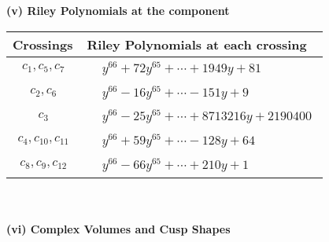 \documentclass[1p]{elsarticle_modified}
\theoremstyle{definition}
\begin{document}
\newpage\renewcommand{\arraystretch}{1}
\flushleft \textbf{(v) Riley Polynomials at the component}\newline \\
\begin{tabular}{m{50pt}|m{274pt}}
Crossings & \hspace{64pt}Riley Polynomials at each crossing \\
\hline $$\begin{aligned}c_{1},c_{5},c_{7}\end{aligned}$$&$\begin{aligned}
&y^{66}+72 y^{65}+\cdots+1949 y+81
\end{aligned}$\\
\hline $$\begin{aligned}c_{2},c_{6}\end{aligned}$$&$\begin{aligned}
&y^{66}-16 y^{65}+\cdots-151 y+9
\end{aligned}$\\
\hline $$\begin{aligned}c_{3}\end{aligned}$$&$\begin{aligned}
&y^{66}-25 y^{65}+\cdots+8713216 y+2190400
\end{aligned}$\\
\hline $$\begin{aligned}c_{4},c_{10},c_{11}\end{aligned}$$&$\begin{aligned}
&y^{66}+59 y^{65}+\cdots-128 y+64
\end{aligned}$\\
\hline $$\begin{aligned}c_{8},c_{9},c_{12}\end{aligned}$$&$\begin{aligned}
&y^{66}-66 y^{65}+\cdots+210 y+1
\end{aligned}$\\
\hline
\end{tabular}\\~\\
\newpage\flushleft \textbf{(vi) Complex Volumes and Cusp Shapes}
\end{document}
